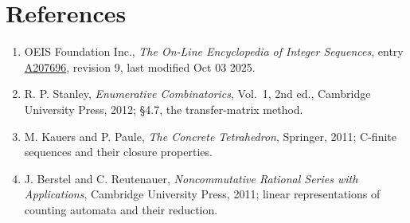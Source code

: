 \documentclass[11pt]{article}
\theoremstyle{definition}
\begin{document}
\section{References}

\begin{enumerate}

\item OEIS Foundation Inc., \emph{The On-Line Encyclopedia of Integer Sequences}, entry \href{https://oeis.org/A207696}{A207696}, revision 9, last modified Oct 03 2025.

\item R. P. Stanley, \emph{Enumerative Combinatorics}, Vol.~1, 2nd ed., Cambridge University Press, 2012; \S4.7, the transfer-matrix method.

\item M. Kauers and P. Paule, \emph{The Concrete Tetrahedron}, Springer, 2011; C-finite sequences and their closure properties.

\item J. Berstel and C. Reutenauer, \emph{Noncommutative Rational Series with Applications}, Cambridge University Press, 2011; linear representations of counting automata and their reduction.

\end{enumerate}
\end{document}
